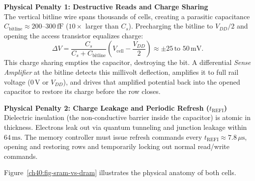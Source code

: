 \begin{formalbox}
\textbf{Physical Penalty 1: Destructive Reads and Charge Sharing}\\
The vertical bitline wire spans thousands of cells, creating a parasitic capacitance
$C_{\text{bitline}} \approx 200\text{--}300\,\text{fF}$ ($10\times$ larger than $C_s$).
Precharging the bitline to $V_{DD}/2$ and opening the access transistor equalizes charge:
\[
    \Delta V = \frac{C_s}{C_s + C_{\text{bitline}}} \left( V_{\text{cell}} - \frac{V_{DD}}{2} \right) \approx \pm 25\,\text{to }50\,\text{mV}.
\]
This charge sharing empties the capacitor, destroying the bit. A differential
\emph{Sense Amplifier} at the bitline detects this millivolt deflection, amplifies it to
full rail voltage ($0\,\text{V}$ or $V_{DD}$), and drives that amplified potential back
into the opened capacitor to restore its charge before the row closes.
\end{formalbox}

\begin{formalbox}
\textbf{Physical Penalty 2: Charge Leakage and Periodic Refresh ($t_{\text{REFI}}$)}\\
Dielectric insulation (the non-conductive barrier inside the capacitor) is atomic in thickness. Electrons leak out via quantum tunneling
and junction leakage within $64\,\text{ms}$. The memory controller must issue
refresh commands every $t_{\text{REFI}} \approx 7.8\,\mu\text{s}$, opening and restoring
rows and temporarily locking out normal read/write commands.
\end{formalbox}

Figure~\ref{ch40:fig-sram-vs-dram} illustrates the physical anatomy of both cells.

